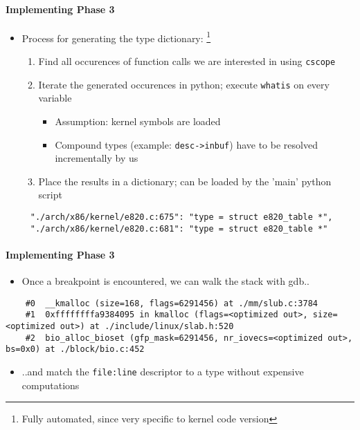\documentclass{i20lecture}
\begin{document}
\begin{frame}[fragile]{\insertsection}
  \framesubtitle{Implementing Phase 3}
    \begin{itemize}
     \item Process for generating the type dictionary: \footnote{Fully automated, since very specific to kernel  code version}
\pause
     \begin{enumerate}
      \item Find all occurences of function calls we are interested in using \texttt{cscope}
\pause
      \item Iterate the generated occurences in python; execute \texttt{whatis} on every variable
      \begin{itemize}
\pause
       \item Assumption: kernel symbols are loaded
\pause
       \item Compound types (example: \lstinline|desc->inbuf|) have to be resolved incrementally by us
      \end{itemize}
\pause
      \item Place the results in a dictionary; can be loaded by the 'main' python script
\pause
     \end{enumerate}
    \end{itemize}
    \begin{lstlisting}
     "./arch/x86/kernel/e820.c:675": "type = struct e820_table *",
     "./arch/x86/kernel/e820.c:681": "type = struct e820_table *"
    \end{lstlisting}
\end{frame}

\begin{frame}[fragile]{\insertsection}
  \framesubtitle{Implementing Phase 3}
    \begin{itemize}
     \item Once a breakpoint is encountered, we can walk the stack with gdb..
    \end{itemize}
\pause
    \begin{lstlisting}
    #0  __kmalloc (size=168, flags=6291456) at ./mm/slub.c:3784
    #1  0xffffffffa9384095 in kmalloc (flags=<optimized out>, size=<optimized out>) at ./include/linux/slab.h:520
    #2  bio_alloc_bioset (gfp_mask=6291456, nr_iovecs=<optimized out>, bs=0x0) at ./block/bio.c:452
    \end{lstlisting}
\pause
    \begin{itemize}
     \item ..and match the \texttt{file:line} descriptor to a type without expensive computations
    \end{itemize}
\end{frame}
\end{document}
